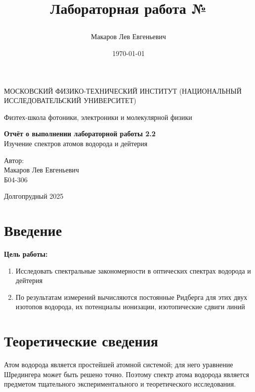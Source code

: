 \documentclass[a4paper,12pt]{article}
\author{Макаров Лев Евгеньевич}
\title{Лабораторная работа №\labnumber

\labname
}
\date{\today}
\newcommand\labname{Изучение спектров атомов водорода и дейтерия}
\newcommand\labnumber{2.2}
\begin{document}
\begin{titlepage}
	\begin{center}
		{\large МОСКОВСКИЙ ФИЗИКО-ТЕХНИЧЕСКИЙ ИНСТИТУТ (НАЦИОНАЛЬНЫЙ ИССЛЕДОВАТЕЛЬСКИЙ УНИВЕРСИТЕТ)}
	\end{center}
	\begin{center}
		{\large Физтех-школа фотоники, электроники и молекулярной физики}
	\end{center}
	
	
	\vspace{4.5cm}
	{\huge
		\begin{center}
			{\bf Отчёт о выполнении лабораторной работы \labnumber}\\
			\labname
		\end{center}
	}
	\vspace{2cm}
	\begin{flushright}
		{\LARGE Автор:\\ Макаров Лев Евгеньевич \\
			\vspace{0.2cm}
			Б04-306}
	\end{flushright}
	\vspace{8cm}
	\begin{center}
		Долгопрудный 2025
	\end{center}
\end{titlepage}

\section{Введение}

\textbf{Цель работы:} 
\begin{enumerate}
	\item Исследовать спектральные закономерности в оптических спектрах водорода и дейтерия
    \item По результатам измерений вычисляются постоянные Ридберга для этих двух изотопов водорода, их потенциалы ионизации, изотопические сдвиги линий
\end{enumerate}


\section{Теоретические сведения}

Атом водорода является простейшей атомной системой; для него уравнение Шредингера может быть решено точно. Поэтому спектр атома водорода является предметом тщательного экспериментального и теоретического исследования.
\end{document}
